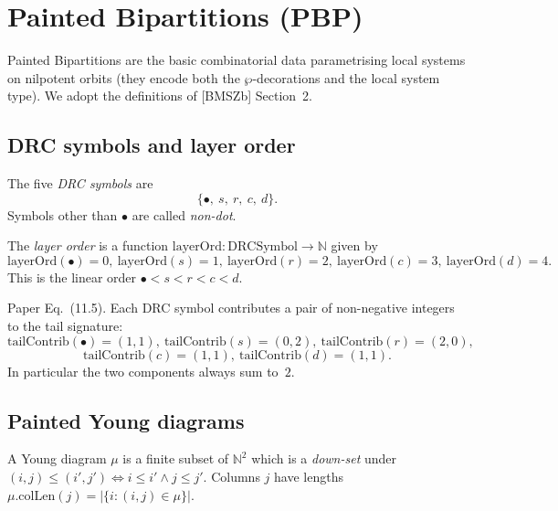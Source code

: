 \chapter{Painted Bipartitions (PBP)}
\label{chap:pbp}

Painted Bipartitions are the basic combinatorial data parametrising local
systems on nilpotent orbits (they encode both the $\wp$-decorations and the
local system type). We adopt the definitions of [BMSZb] Section~2.

\section{DRC symbols and layer order}

\begin{definition}
  \label{def:drc_symbols}
  \leanok
  The five \emph{DRC symbols} are
  \[ \{\bullet,\ s,\ r,\ c,\ d\}. \]
  Symbols other than $\bullet$ are called \emph{non-dot}.
\end{definition}

\begin{definition}
  \label{def:layerOrd}
  \leanok
  The \emph{layer order} is a function $\mathrm{layerOrd} : \mathrm{DRCSymbol} \to \mathbb{N}$ given by
  \[ \mathrm{layerOrd}(\bullet) = 0,\ \mathrm{layerOrd}(s) = 1,\ \mathrm{layerOrd}(r) = 2,\ \mathrm{layerOrd}(c) = 3,\ \mathrm{layerOrd}(d) = 4. \]
  This is the linear order $\bullet < s < r < c < d$.
\end{definition}

\begin{definition}
  \label{def:tailContrib}
  \leanok
  Paper Eq.~(11.5). Each DRC symbol contributes a pair of non-negative integers
  to the tail signature:
  \[
    \mathrm{tailContrib}(\bullet) = (1,1),\ \mathrm{tailContrib}(s) = (0, 2),\ \mathrm{tailContrib}(r) = (2, 0),
  \]
  \[
    \mathrm{tailContrib}(c) = (1, 1),\ \mathrm{tailContrib}(d) = (1, 1).
  \]
  In particular the two components always sum to~$2$.
\end{definition}

\section{Painted Young diagrams}

\begin{definition}
  \label{def:yd}
  \leanok
  A Young diagram $\mu$ is a finite subset of $\mathbb{N}^2$ which is a
  \emph{down-set} under $(i, j) \leq (i', j') \iff i \leq i' \land j \leq j'$.
  Columns $j$ have lengths $\mu.\mathrm{colLen}(j) = |\{i : (i, j) \in \mu\}|$.
\end{definition}

